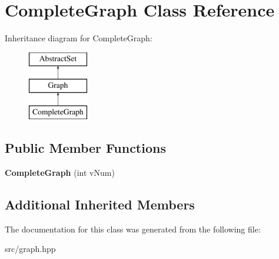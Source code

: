 \hypertarget{classCompleteGraph}{\section{Complete\-Graph Class Reference}
\label{classCompleteGraph}
}
Inheritance diagram for Complete\-Graph\-:\begin{figure}[H]
\begin{center}
\leavevmode
\includegraphics[height=3.000000cm]{classCompleteGraph}
\end{center}
\end{figure}
\subsection*{Public Member Functions}
\begin{DoxyCompactItemize}
\item 
\hypertarget{classCompleteGraph_ab74d38ce74de8bd6e413d416af89d9fa}{{\bfseries Complete\-Graph} (int v\-Num)}\label{classCompleteGraph_ab74d38ce74de8bd6e413d416af89d9fa}

\end{DoxyCompactItemize}
\subsection*{Additional Inherited Members}


The documentation for this class was generated from the following file\-:\begin{DoxyCompactItemize}
\item 
src/graph.\-hpp\end{DoxyCompactItemize}
